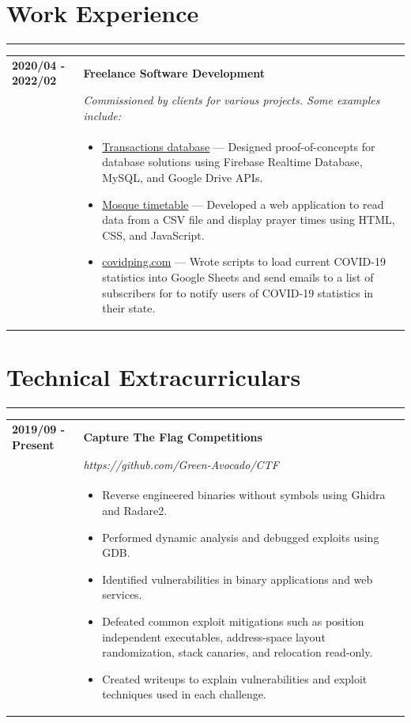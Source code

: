 \documentclass[letterpaper]{article}
\newcommand{\sect}[1]{\section*{#1}
                        {\color{cyan}
                        \rule{\textwidth}{1pt}
                        \vspace{-1ex}}}
\begin{document}
    \sect{Work Experience}

        \begin{tabular}{p{} p{}}
            \textbf{2020/04 - 2022/02} & \textbf{Freelance Software Development} \\
            & \emph{Commissioned by clients for various projects. Some examples include:} \\
            & \begin{itemize}
                \item \underline{Transactions database} ---
                    Designed proof-of-concepts for database solutions using Firebase Realtime Database,
                    MySQL, and Google Drive APIs.
                \item \underline{Mosque timetable} ---
                    Developed a web application to read data from a CSV file and display prayer times
                    using HTML, CSS, and JavaScript.
                \item \underline{covidping.com} ---
                    Wrote scripts to load current COVID-19 statistics into Google Sheets and send emails
                    to a list of subscribers for to notify users of COVID-19 statistics in their state.
            \end{itemize}
        \end{tabular}

    \sect{Technical Extracurriculars}

        \begin{tabular}{p{} p{}}
            \textbf{2019/09 - Present} & \textbf{Capture The Flag Competitions} \\
            & \emph{https://github.com/Green-Avocado/CTF} \\
            & \begin{itemize}
                \item Reverse engineered binaries without symbols using Ghidra and Radare2.
                \item Performed dynamic analysis and debugged exploits using GDB.
                \item Identified vulnerabilities in binary applications and web services.
                \item Defeated common exploit mitigations such as position independent executables,
                    address-space layout randomization, stack canaries, and relocation read-only.
                \item Created writeups to explain vulnerabilities and exploit techniques used in each
                    challenge.
            \end{itemize}
            \\
        \end{tabular}
\end{document}
